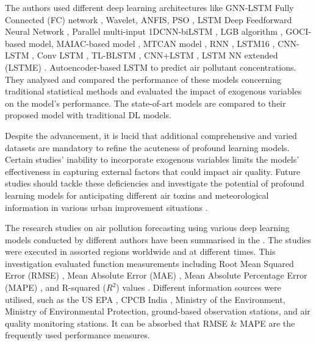 The authors used different deep learning architectures like GNN-LSTM Fully Connected (FC) network \cite{li2023nested},  Wavelet,  ANFIS,  PSO \cite{pruthi2022low},  LSTM Deep Feedforward Neural Network \cite{menares2021forecasting},  Parallel multi-input 1DCNN-biLSTM \cite{zhu2023deep},  LGB algorithm \cite{kim2022short},  GOCI-based model,  MAIAC-based model \cite{lee2021potential},  MTCAN model \cite{samal2021multi},  RNN \cite{kurnaz2022prediction},  LSTM16 \cite{das2022prediction},  CNN-LSTM \cite{natsagdorj2023prediction},  Conv LSTM \cite{zhu2023deep},  TL-BLSTM \cite{ma2019improving},  CNN+LSTM \cite{qin2019novel},  LSTM NN extended (LSTME) \cite{li2017long}. Autoencoder-based LSTM to predict air pollutant concentrations. They analysed and compared the performance of these models concerning traditional statistical methods and evaluated the impact of exogenous variables on the model's performance. The state-of-art models are compared to their proposed model with traditional DL models.
\par Despite the advancement,  it is lucid that additional comprehensive and varied datasets are mandatory to refine the acuteness of profound learning models. Certain studies' inability to incorporate exogenous variables limits the models' effectiveness in capturing external factors that could impact air quality. Future studies should tackle these deficiencies and investigate the potential of profound learning models for anticipating different air toxins and meteorological information in various urban improvement situations \cite{samal2021multi}.
\par The research studies on air pollution forecasting using various deep learning models conducted by different authors have been summarised in the . The studies were executed in assorted regions worldwide and at different times. This investigation evaluated function measurements including Root Mean Squared Error (RMSE) \cite{das2022prediction, kurnaz2022prediction, samal2021multi, kim2022short, zhu2023investigation, menares2021forecasting, nath2021long, du2019deep, li2017long, qin2019novel, ma2019improving, natsagdorj2023prediction},  Mean Absolute Error (MAE) \cite{li2023nested, menares2021forecasting, zhu2023investigation, ma2019improving, nath2021long, du2019deep, li2017long},  Mean Absolute Percentage Error (MAPE) \cite{li2017long, ma2019improving},  and R-squared ($R^2$) values \cite{eren2023predicting, lee2021potential, kim2022short, zhu2023investigation, menares2021forecasting}. Different information sources were utilised,  such as the US EPA \cite{li2023nested},  CPCB India \cite{nath2021long, samal2021multi, pruthi2022low},  Ministry of the Environment,  Ministry of Environmental Protection,  ground-based observation stations,  and air quality monitoring stations. It can be absorbed that RMSE \& MAPE are the frequently used performance measures.
